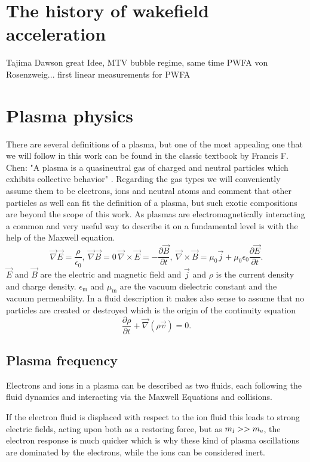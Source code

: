 
\section{The history of wakefield acceleration}
Tajima Dawson great Idee, MTV bubble regime, same time PWFA von Rosenzweig... first linear measurements for PWFA
\section{Plasma physics}
There are several definitions of a plasma, but one of the most appealing one that we will follow in this work can be found in the classic 
textbook by Francis F. Chen:
"A plasma is a quasineutral gas of charged and neutral particles which
exhibits collective behavior" \cite{Chen_book_Plasma}.
Regarding the gas types we will conveniently assume them to be electrons, ions and neutral atoms and comment that other particles as well can fit the definition of a plasma, but such exotic compositions are beyond the scope of this work.
As plasmas are electromagnetically interacting a common and very useful way to describe it on a fundamental level is with the help of the Maxwell equation.
\begin{equation}
\label{eqn:Maxwell}
\vec{\nabla} \vec{E} = \frac{\rho}{\epsilon_0},\	\vec{\nabla}\vec{B} =0\,	\vec{\nabla}\times\vec{E}=-\frac{\partial \vec{B}}{\partial t},\ 
 \vec{\nabla}\times \vec{B}=\mu_0\vec{j}+\mu_0\epsilon_0\frac{\partial \vec{E}}{\partial t}.
\end{equation}
$\vec{E}$ and $\vec{B}$ are the electric and magnetic field and  $\vec{j}$ and $\rho$ is the current density and charge density.
$\epsilon_\mathrm{m}$ and $\mu_\mathrm{m}$ are the vacuum  dielectric constant and the vacuum permeability.
In a fluid description it makes also sense to assume that no particles are created or destroyed which is the origin of the 
continuity equation 
\begin{equation}
\frac{\partial \rho}{\partial t} + \vec{\nabla}(\rho \vec{v})=0.
\end{equation}




\subsection*{Plasma frequency}
Electrons and ions in a plasma can be described as two fluids, each following the fluid dynamics and interacting via the Maxwell Equations and collisions.

If the electron fluid is displaced with respect to the ion fluid this leads to strong electric fields, acting upon both as a restoring force, but as $m_\mathrm{i}>>m_\mathrm{e}$, the electron response is much quicker which is why these kind of plasma oscillations are dominated by the electrons, while the ions can be considered inert.

